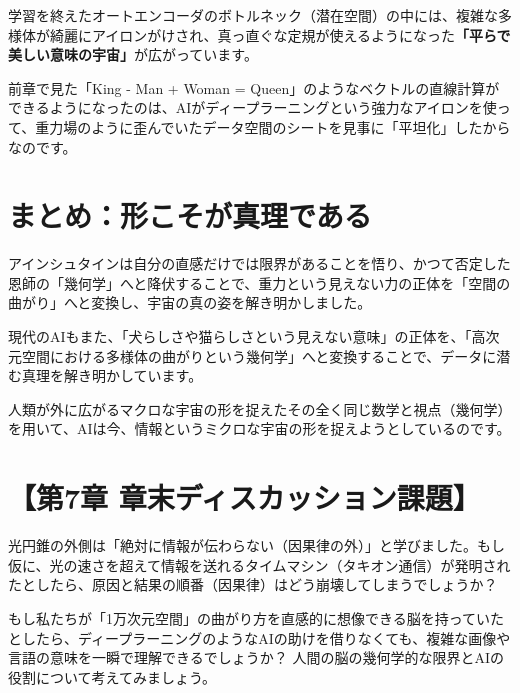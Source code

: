 学習を終えたオートエンコーダのボトルネック（潜在空間）の中には、複雑な多様体が綺麗にアイロンがけされ、真っ直ぐな定規が使えるようになった\textbf{「平らで美しい意味の宇宙」}が広がっています。

前章で見た「King - Man + Woman = Queen」のようなベクトルの直線計算ができるようになったのは、AIがディープラーニングという強力なアイロンを使って、重力場のように歪んでいたデータ空間のシートを見事に「平坦化」したからなのです。

\section{まとめ：形こそが真理である}

アインシュタインは自分の直感だけでは限界があることを悟り、かつて否定した恩師の「幾何学」へと降伏することで、重力という見えない力の正体を「空間の曲がり」へと変換し、宇宙の真の姿を解き明かしました。

現代のAIもまた、「犬らしさや猫らしさという見えない意味」の正体を、「高次元空間における多様体の曲がりという幾何学」へと変換することで、データに潜む真理を解き明かしています。

人類が外に広がるマクロな宇宙の形を捉えたその全く同じ数学と視点（幾何学）を用いて、AIは今、情報というミクロな宇宙の形を捉えようとしているのです。

\section*{【第7章 章末ディスカッション課題】}

光円錐の外側は「絶対に情報が伝わらない（因果律の外）」と学びました。もし仮に、光の速さを超えて情報を送れるタイムマシン（タキオン通信）が発明されたとしたら、原因と結果の順番（因果律）はどう崩壊してしまうでしょうか？

もし私たちが「1万次元空間」の曲がり方を直感的に想像できる脳を持っていたとしたら、ディープラーニングのようなAIの助けを借りなくても、複雑な画像や言語の意味を一瞬で理解できるでしょうか？ 人間の脳の幾何学的な限界とAIの役割について考えてみましょう。




